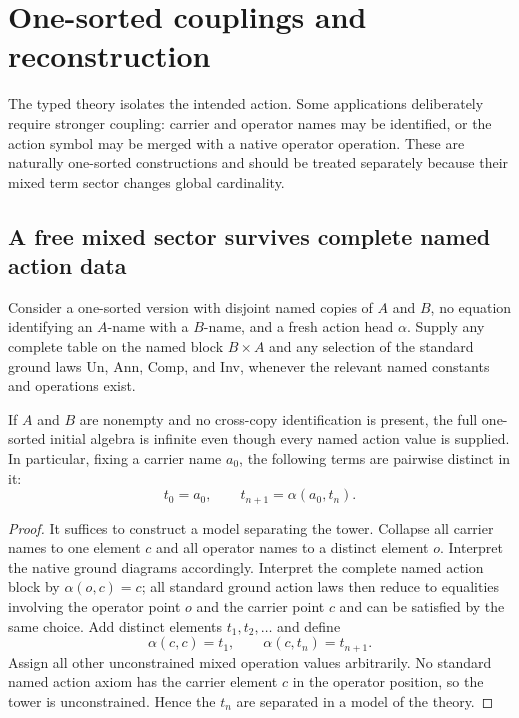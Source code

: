 \section{One-sorted couplings and reconstruction}\label{sec:onesorted}

The typed theory isolates the intended action.  Some applications deliberately require stronger coupling: carrier and operator names may be identified, or the action symbol may be merged with a native operator operation.  These are naturally one-sorted constructions and should be treated separately because their mixed term sector changes global cardinality.

\subsection{A free mixed sector survives complete named action data}

Consider a one-sorted version with disjoint named copies of $A$ and $B$, no equation identifying an $A$-name with a $B$-name, and a fresh action head $\alpha$.  Supply any complete table on the named block $B\times A$ and any selection of the standard ground laws Un, Ann, Comp, and Inv, whenever the relevant named constants and operations exist.

\begin{proposition}\label{prop:mixedinfinite}
If $A$ and $B$ are nonempty and no cross-copy identification is present, the full one-sorted initial algebra is infinite even though every named action value is supplied. In particular, fixing a carrier name $a_0$, the following terms are pairwise distinct in it:
\[
t_0=a_0,
\qquad
t_{n+1}=\alpha(a_0,t_n).
\]
\end{proposition}

\begin{proof}
It suffices to construct a model separating the tower.  Collapse all carrier names to one element $c$ and all operator names to a distinct element $o$.  Interpret the native ground diagrams accordingly.  Interpret the complete named action block by $\alpha(o,c)=c$; all standard ground action laws then reduce to equalities involving the operator point $o$ and the carrier point $c$ and can be satisfied by the same choice.  Add distinct elements $t_1,t_2,\ldots$ and define
\[
\alpha(c,c)=t_1,
\qquad
\alpha(c,t_n)=t_{n+1}.
\]
Assign all other unconstrained mixed operation values arbitrarily.  No standard named action axiom has the carrier element $c$ in the operator position, so the tower is unconstrained.  Hence the $t_n$ are separated in a model of the theory.
\end{proof}

